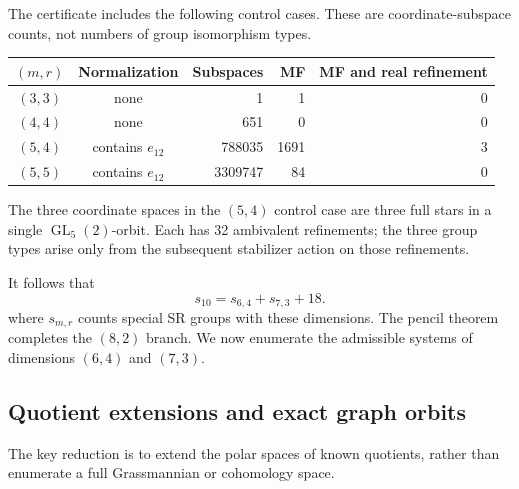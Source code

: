 \documentclass[11pt,a4paper]{amsart}
\theoremstyle{definition}
\theoremstyle{remark}
\DeclareMathOperator{\GL}{GL}
\numberwithin{equation}{section}
\begin{document}
The certificate includes the following control cases. These are
coordinate-subspace counts, not numbers of group isomorphism types.
\begin{center}\small
\begin{tabular}{@{}ccrrr@{}}\toprule
$(m,r)$&Normalization&Subspaces&MF&MF and real refinement\\\midrule
$(3,3)$&none&1&1&0\\
$(4,4)$&none&651&0&0\\
$(5,4)$&contains $e_{12}$&788035&1691&3\\
$(5,5)$&contains $e_{12}$&3309747&84&0\\\bottomrule
\end{tabular}
\end{center}
The three coordinate spaces in the $(5,4)$ control case are three
full stars in a single $\GL_5(2)$-orbit. Each has 32 ambivalent
refinements; the three group types arise only from the subsequent
stabilizer action on those refinements.

It follows that
\begin{equation}\label{eq:remaining-three}
 s_{10}=s_{6,4}+s_{7,3}+18.
\end{equation}
where $s_{m,r}$ counts special SR groups with these dimensions.
The pencil theorem completes the $(8,2)$ branch. We now enumerate
the admissible systems of dimensions $(6,4)$ and $(7,3)$.

\subsection{Quotient extensions and exact graph orbits}
The key reduction is to extend the polar spaces of known quotients,
rather than enumerate a full Grassmannian or cohomology space.
\end{document}
